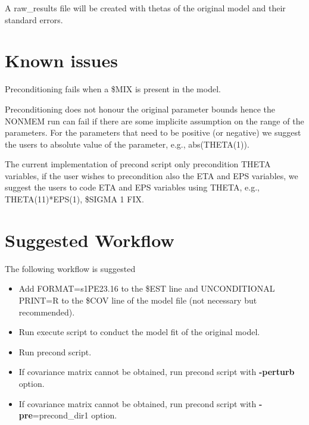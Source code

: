 A raw\_results file will be created with thetas of the original model and their standard errors.
%
%
%
%

\section{Known issues}
Preconditioning fails when a \$MIX is present in the model.

Preconditioning does not honour the original parameter bounds hence the NONMEM run can fail if there are some implicite assumption on the range of the parameters.  For the parameters that need to be positive (or negative) we suggest the users to absolute value of the parameter, e.g., abs(THETA(1)).

The current implementation of precond script only precondition THETA variables, if the user wishes to precondition also the ETA and EPS variables, we suggest the users to code ETA and EPS variables using THETA, e.g., THETA(11)*EPS(1), \$SIGMA 1 FIX.

\section{Suggested Workflow}
The following workflow is suggested

\begin{itemize}
\item Add FORMAT=s1PE23.16 to the \$EST line and UNCONDITIONAL PRINT=R to the \$COV line of the model file (not necessary but recommended).
\item Run execute script to conduct the model fit of the original model.
\item Run precond script.
\item If covariance matrix cannot be obtained, run precond script with {\bf -perturb} option.
\item If covariance matrix cannot be obtained, run precond script with {\bf -pre}=precond\_dir1 option.
\end{itemize}

